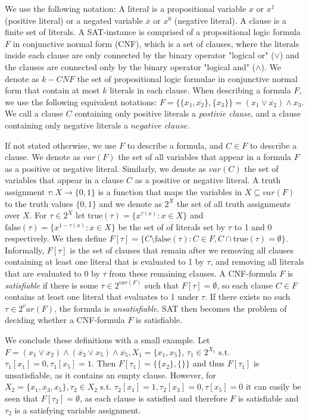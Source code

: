 \documentclass[11pt,a4paper]{article}
\theoremstyle{definition}
\begin{document}
We use the following notation: A literal is a propositional variable $x$ or $x^1$ (positive literal) or a negated variable $\overline{x}$ or $x^0$ (negative literal). A clause is a finite set of literals. A SAT-instance is comprised of a propositional logic formula $F$ in conjunctive normal form (CNF), which is a set of clauses, where the literals inside each clause are only connected by the binary operator "logical or" ($\lor$) and the clauses are connected only by the binary operator "logical and" ($\land$). We denote as $k-CNF$ the set of propositional logic formulae in conjunctive normal form that contain at most $k$ literals in each clause. When describing a formula $F$, we use the following equivalent notations: $F = \{ \{x_1, \overline{x_2}\}, \{x_3\} \} = (x_1 \lor \overline{x_2}) \land x_3$. We call a clause $C$ containing only positive literals a \textit{postivie clause}, and a clause containing only negative literals a $\textit{negative clause}$. 

If not stated otherwise, we use $F$ to describe a formula, and $C \in F$ to describe a clause. We denote as $var(F)$ the set of all variables that appear in a formula $F$ as a positive or negative literal. Similarly, we denote as $var(C)$ the set of variables that appear in a clause $C$ as a positive or negative literal. A truth assignment $\tau: X \to \{0,1\}$ is a function that maps the variables in $X \subseteq var(F)$ to the truth values $\{0,1\}$ and we denote as $2^X$ the set of all truth assignments over $X$. For $\tau \in 2^X$ let $\text{true}(\tau) = \{x^{\tau(x)} \colon x \in X\}$ and $\text{false}(\tau) = \{x^{1-\tau(x)} \colon x \in X\}$ be the set of of literals set by $\tau$ to 1 and 0 respectively. We then define $F[\tau] = \{ C \setminus \text{false}(\tau) \colon C \in F, C \cap \text{true}(\tau) = \emptyset \}$. Informally, $F[\tau]$ is the set of clauses that remain after we removing all clauses containing at least one literal that is evaluated to 1 by $\tau$, and removing all literals that are evaluated to 0 by $\tau$ from these remaining clauses. A CNF-formula $F$ is \textit{satisfiable} if there is some $\tau \in 2^{var(F)}$ such that $F[\tau] = \emptyset$, so each clause $C \in F$ contains at least one literal that evaluates to 1 under $\tau$. If there exists no such $\tau \in 2^var(F)$, the formula is \textit{unsatisfiable}. SAT then becomes the problem of deciding whether a CNF-formula $F$ is satisfiable.

We conclude these definitions with a small example. Let $F = (x_1 \lor x_2) \land (\overline{x_3} \lor x_5) \land \overline{x_5}, X_1 = \{x_1, x_5\}$, $\tau_1 \in 2^{X_1}$ s.t. $\tau_1[x_1] = 0, \tau_1[x_5] = 1$. Then $F[\tau_1] = \{\{x_2\}, \{\}\}$ and thus $F[\tau_1]$ is unsatisfiable, as it contains an empty clause. However, for $X_2 = \{x_1, x_3, x_5\}, \tau_2 \in X_2$ s.t. $\tau_2[x_1] = 1, \tau_2[x_3] = 0, \tau[x_5] = 0$ it can easily be seen that $F[\tau_2] = \emptyset$, as each clause is satisfied and therefore $F$ is satisfiable and $\tau_2$ is a satisfying variable assignment. \\
\end{document}

